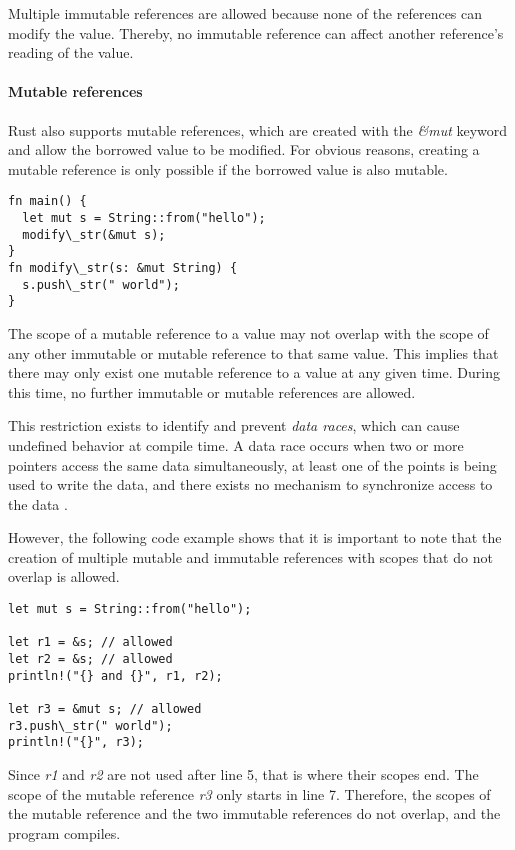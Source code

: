 \documentclass[sigplan,11pt,nonacm]{acmart}
\begin{document}
Multiple immutable references are allowed because none of the references can modify the value.
Thereby, no immutable reference can affect another reference's reading of the value.


\paragraph{Mutable references}

Rust also supports mutable references, which are created with the \emph{&mut} keyword and allow the borrowed value to be modified.
For obvious reasons, creating a mutable reference is only possible if the borrowed value is also mutable.

\begin{lstlisting}
fn main() {
  let mut s = String::from("hello");
  modify\_str(&mut s);
}
fn modify\_str(s: &mut String) {
  s.push\_str(" world");
}
\end{lstlisting}

The scope of a mutable reference to a value may not overlap with the scope of any other immutable or mutable reference to that same value.
This implies that there may only exist one mutable reference to a value at any given time.
During this time, no further immutable or mutable references are allowed.

This restriction exists to identify and prevent \emph{data races}, which can cause undefined behavior at compile time.
A data race occurs when two or more pointers access the same data simultaneously, at least one of the points is being used to write the data, and there exists no mechanism to synchronize access to the data \cite{rust-book}.

However, the following code example \cite{rust-book} shows that it is important to note that the creation of multiple mutable and immutable references with scopes that do not overlap is allowed.

\begin{lstlisting}
let mut s = String::from("hello");

let r1 = &s; // allowed
let r2 = &s; // allowed
println!("{} and {}", r1, r2);

let r3 = &mut s; // allowed
r3.push\_str(" world");
println!("{}", r3);
\end{lstlisting}

Since \emph{r1} and \emph{r2} are not used after line 5, that is where their scopes end.
The scope of the mutable reference \emph{r3} only starts in line 7.
Therefore, the scopes of the mutable reference and the two immutable references do not overlap, and the program compiles.
\end{document}
